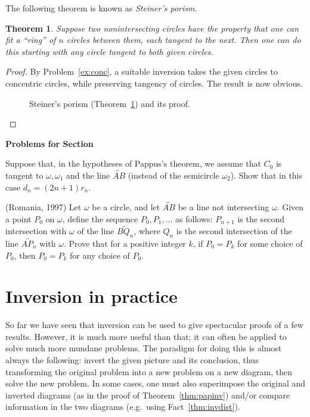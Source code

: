 \documentclass[12pt]{book}
\newcounter{exc}
\numberwithin{exc}{section}
\numberwithin{figure}{section}
\newenvironment{exer}{\vspace{0.1in}
\noindent \textbf{Problems for Section~\thesection} \vspace{0.1in}
\begin{list}{\arabic{exc}.}{\usecounter{exc}}}{\end{list}}
\newtheorem{theorem}{Theorem}[section]
\numberwithin{equation}{theorem}
\def\ii{\item}
\def\line#1{\overleftrightarrow{#1}}
\begin{document}
The following theorem is known as \emph{Steiner's porism}.
 
\begin{theorem}\label{thm:steiner}
Suppose two nonintersecting circles have the property that one can 
fit a ``ring'' of $n$ circles between them, each tangent to the next.
Then one can do this starting with any circle 
tangent to both given circles.
\end{theorem}
\begin{proof}
By Problem~\ref{ex:conc}, a suitable inversion takes the given circles to 
concentric circles, while preserving tangency of circles. The result 
is now obvious.
\begin{figure}[ht]
\caption{Steiner's porism (Theorem~\ref{thm:steiner}) and its proof.}
\end{figure}
\end{proof}

\begin{exer}
\ii 
Suppose that, in the hypotheses of Pappus's theorem, we assume that
$C_0$ is tangent to $\omega, \omega_1$ and the line $\line{AB}$ (instead of
the semicircle $\omega_2$). Show that in this case $d_n = (2n+1) r_n$. 
\ii (Romania, 1997) \label{ex:rom97}
Let $\omega$ be a circle, and let $\line{AB}$ be
a line not intersecting $\omega$. 
Given a point $P_0$ on $\omega$, define the sequence $P_0, P_1, \dots$
as follows: $P_{n+1}$ is the second intersection with $\omega$ of the line
$\line{BQ_n}$, where $Q_n$ is the second intersection of the line 
$\line{AP_n}$ with $\omega$.
Prove that for a positive integer $k$, if $P_0 = P_k$ for some choice of
$P_0$, then $P_0 = P_k$ for any choice of $P_0$.
\end{exer}

\section{Inversion in practice}

So far we have seen that inversion can be used to give spectacular proofs
of a few results. However, it is much more useful than that; it can often
be applied to solve much more mundane problems. The 
paradigm for doing this is almost always the following: 
invert the given picture and its conclusion, thus transforming the
original problem into a new problem on a new diagram, then
solve the new problem. In some cases, one must also 
superimpose the original and
inverted diagrams (as in the proof of Theorem~\ref{thm:papinv}) and/or compare
information in the two diagrams (e.g.\ using Fact~\ref{thm:invdist}).
\end{document}

